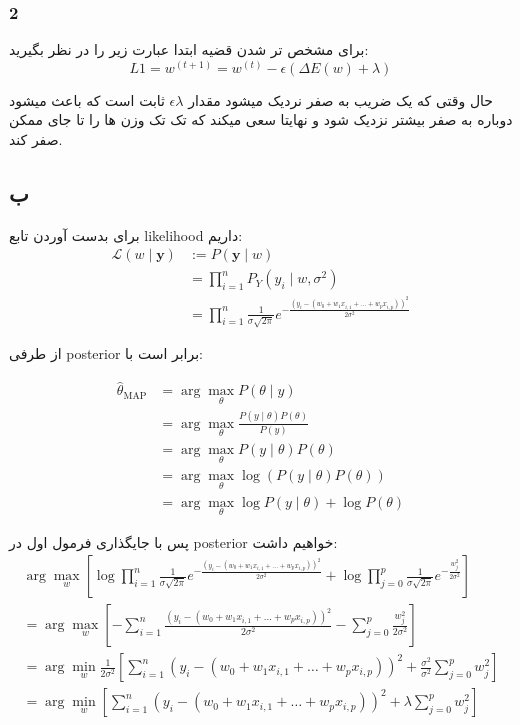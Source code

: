 \documentclass{article}[12pt]
\begin{document}
\subsubsection{2}
برای مشخص تر شدن قضیه ابتدا عبارت زیر را در نظر بگیرید:
\begin{equation*}
	L 1=w^{(t+1)}=w^{(t)}-\epsilon(\Delta E(w)+\lambda)
\end{equation*}

حال وقتی که یک ضریب به صفر نردیک میشود مقدار 
$\epsilon \lambda$
ثابت است که باعث میشود دوباره به صفر بیشتر نزدیک شود و نهایتا سعی میکند که تک تک وزن ها را تا جای ممکن صفر کند. 
\subsection{ب}
برای بدست آوردن تابع likelihood داریم: 
\begin{equation*}
\begin{aligned}
	\mathcal{L}(w \mid \mathbf{y}) &:=P(\mathbf{y} \mid w) \\
	&=\prod_{i=1}^{n} P_{Y}\left(y_{i} \mid w, \sigma^{2}\right) \\
	&=\prod_{i=1}^{n} \frac{1}{\sigma \sqrt{2 \pi}} e^{-\frac{\left(y_{i}-\left(w_{0}+w_{1} x_{i, 1}+\ldots+w_{p} x_{i, p}\right)\right)^{2}}{2 \sigma^{2}}}
\end{aligned}
\end{equation*}

از طرفی posterior برابر است با:

$$
\begin{aligned}
	\hat{\theta}_{\mathrm{MAP}} &=\arg \max _{\theta} P(\theta \mid y) \\
	&=\arg \max _{\theta} \frac{P(y \mid \theta) P(\theta)}{P(y)} \\
	&=\arg \max _{\theta} P(y \mid \theta) P(\theta) \\
	&=\arg \max _{\theta} \log (P(y \mid \theta) P(\theta)) \\
	&=\arg \max _{\theta} \log P(y \mid \theta)+\log P(\theta)
\end{aligned}
$$

پس با جایگذاری فرمول اول در posterior خواهیم داشت:
$$
\begin{array}{l}
	\arg \max _{w}\left[\log \prod_{i=1}^{n} \frac{1}{\sigma \sqrt{2 \pi}} e^{-\frac{\left(y_{i}-\left(w_{0}+w_{1} x_{i, 1}+\ldots+w_{p} x_{i, p}\right)\right)^{2}}{2 \sigma^{2}}}+\log \prod_{j=0}^{p} \frac{1}{\sigma \sqrt{2 \pi}} e^{-\frac{w_{j}^{2}}{2 \sigma^{2}}}\right] \\
	=\arg \max _{w}\left[-\sum_{i=1}^{n} \frac{\left(y_{i}-\left(w_{0}+w_{1} x_{i, 1}+\ldots+w_{p} x_{i, p}\right)\right)^{2}}{2 \sigma^{2}}-\sum_{j=0}^{p} \frac{w_{j}^{2}}{2 \sigma^{2}}\right] \\
	=\arg \min _{w} \frac{1}{2 \sigma^{2}}\left[\sum_{i=1}^{n}\left(y_{i}-\left(w_{0}+w_{1} x_{i, 1}+\ldots+w_{p} x_{i, p}\right)\right)^{2}+\frac{\sigma^{2}}{\sigma^{2}} \sum_{j=0}^{p} w_{j}^{2}\right] \\
	=\arg \min _{w}\left[\sum_{i=1}^{n}\left(y_{i}-\left(w_{0}+w_{1} x_{i, 1}+\ldots+w_{p} x_{i, p}\right)\right)^{2}+\lambda \sum_{j=0}^{p} w_{j}^{2}\right]
\end{array}
$$
\end{document}
